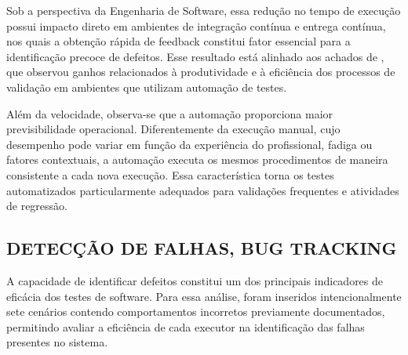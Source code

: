 \documentclass{UNESC}
\begin{document}
Sob a perspectiva da Engenharia de Software, essa redução no tempo de execução possui impacto direto em ambientes de integração contínua e entrega contínua, nos quais a obtenção rápida de feedback constitui fator essencial para a identificação precoce de defeitos. Esse resultado está alinhado aos achados de , que observou ganhos relacionados à produtividade e à eficiência dos processos de validação em ambientes que utilizam automação de testes.

Além da velocidade, observa-se que a automação proporciona maior previsibilidade operacional. Diferentemente da execução manual, cujo desempenho pode variar em função da experiência do profissional, fadiga ou fatores contextuais, a automação executa os mesmos procedimentos de maneira consistente a cada nova execução. Essa característica torna os testes automatizados particularmente adequados para validações frequentes e atividades de regressão.

\subsection{DETECÇÃO DE FALHAS, BUG TRACKING}

A capacidade de identificar defeitos constitui um dos principais indicadores de eficácia dos testes de software. Para essa análise, foram inseridos intencionalmente sete cenários contendo comportamentos incorretos previamente documentados, permitindo avaliar a eficiência de cada executor na identificação das falhas presentes no sistema.
\end{document}
